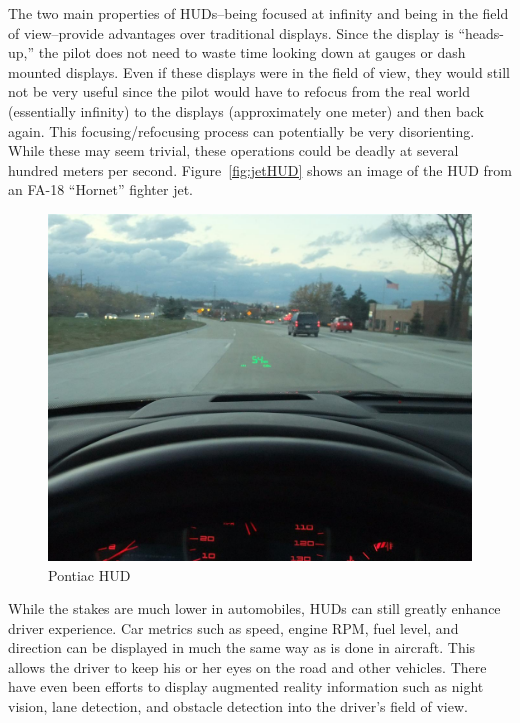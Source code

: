 The two main properties of HUDs--being focused at infinity and being
in the field of view--provide advantages over traditional displays. Since
the display is ``heads-up,'' the pilot does not need to waste time looking
down at gauges or dash mounted displays. Even if these displays were in the
field of view, they would still not be very useful since the pilot would
have to refocus from the real world (essentially infinity) to the displays
(approximately one meter) and then back again. This focusing/refocusing
process can potentially be very disorienting. While these may seem trivial,
these operations could be deadly at several hundred meters per second.
Figure~\ref{fig:jetHUD} shows an image of the HUD from an FA-18 ``Hornet''
fighter jet.

\begin{figure}[h]
	\includegraphics[width=\textwidth]{img/PontiacHUD.jpg}
	\caption{Pontiac HUD}
	\label{fig:PontiacHUD}
\end{figure}

While the stakes are much lower in automobiles, HUDs can still greatly
enhance driver experience. Car metrics such as speed, engine RPM, fuel
level, and direction can be displayed in much the same way as is done in
aircraft. This allows the driver to keep his or her eyes on the road and other
vehicles. There have even been efforts to display augmented reality
information such as night vision, lane detection, and obstacle detection
into the driver's field of view.

